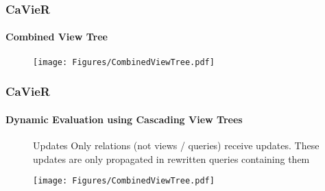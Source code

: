 \documentclass[
	11pt, %
]{beamer}
\begin{document}
\begin{frame}
	\frametitle{CaVieR}
	\framesubtitle{Combined View Tree}
	\begin{figure}
		\begin{minipage}{0.5\textwidth}
		\end{minipage}
		\begin{minipage}{0.49\textwidth}
			\vspace{-0.8cm}
			\texttt{[image: Figures/CombinedViewTree.pdf]}
		\end{minipage}
		\end{figure}
\end{frame}

\begin{frame}
	\frametitle{CaVieR}
	\framesubtitle{Dynamic Evaluation using Cascading View Trees}
	\begin{figure}
		\begin{minipage}{0.5\textwidth}
			\begin{block}{Updates}
				Only relations (not views / queries) receive updates. These updates are only propagated in rewritten queries containing them
			\end{block}
		\end{minipage}
		\begin{minipage}{0.49\textwidth}
			\vspace{-0.8cm}
			\texttt{[image: Figures/CombinedViewTree.pdf]}
		\end{minipage}
	\end{figure}
\end{frame}
\end{document}
